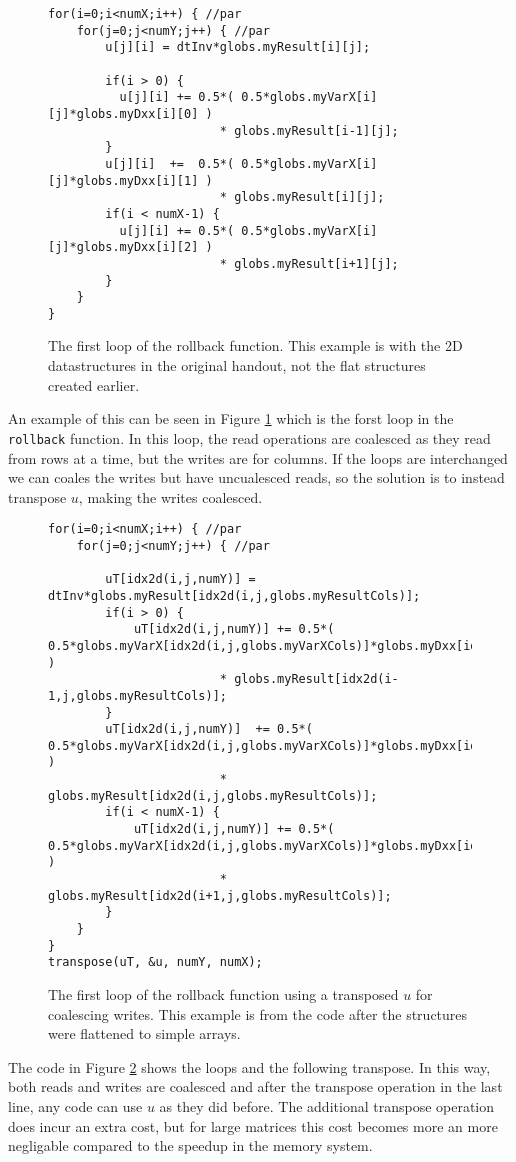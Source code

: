 \begin{figure}[H]
    \begin{lstlisting}
for(i=0;i<numX;i++) { //par
    for(j=0;j<numY;j++) { //par
        u[j][i] = dtInv*globs.myResult[i][j];

        if(i > 0) {
          u[j][i] += 0.5*( 0.5*globs.myVarX[i][j]*globs.myDxx[i][0] )
                        * globs.myResult[i-1][j];
        }
        u[j][i]  +=  0.5*( 0.5*globs.myVarX[i][j]*globs.myDxx[i][1] )
                        * globs.myResult[i][j];
        if(i < numX-1) {
          u[j][i] += 0.5*( 0.5*globs.myVarX[i][j]*globs.myDxx[i][2] )
                        * globs.myResult[i+1][j];
        }
    }
}
    \end{lstlisting}
    \caption{The first loop of the rollback function. This example is with the
    2D datastructures in the original handout, not the flat structures created
    earlier.}
    \label{code:coal1}
\end{figure}

An example of this can be seen in Figure \ref{code:coal1} which is the forst
loop in the \texttt{rollback} function. In this loop, the read operations are
coalesced as they read from rows at a time, but the writes are for columns. If
the loops are interchanged we can coales the writes but have uncualesced reads,
so the solution is to instead transpose $u$, making the writes coalesced.

\begin{figure}[H]
    \begin{lstlisting}
for(i=0;i<numX;i++) { //par
    for(j=0;j<numY;j++) { //par

        uT[idx2d(i,j,numY)] = dtInv*globs.myResult[idx2d(i,j,globs.myResultCols)];
        if(i > 0) {
            uT[idx2d(i,j,numY)] += 0.5*( 0.5*globs.myVarX[idx2d(i,j,globs.myVarXCols)]*globs.myDxx[idx2d(i,0,globs.myDxxCols)] )
                        * globs.myResult[idx2d(i-1,j,globs.myResultCols)];
        }
        uT[idx2d(i,j,numY)]  += 0.5*( 0.5*globs.myVarX[idx2d(i,j,globs.myVarXCols)]*globs.myDxx[idx2d(i,1,globs.myDxxCols)] )
                        * globs.myResult[idx2d(i,j,globs.myResultCols)];
        if(i < numX-1) {
            uT[idx2d(i,j,numY)] += 0.5*( 0.5*globs.myVarX[idx2d(i,j,globs.myVarXCols)]*globs.myDxx[idx2d(i,2,globs.myDxxCols)] )
                        * globs.myResult[idx2d(i+1,j,globs.myResultCols)];
        }
    }
}
transpose(uT, &u, numY, numX);
    \end{lstlisting}
    \caption{The first loop of the rollback function using a transposed $u$ for
    coalescing writes. This example is from the code after the structures were
    flattened to simple arrays.}
    \label{code:coal2}
\end{figure}

The code in Figure \ref{code:coal2} shows the loops and the following transpose.
In this way, both reads and writes are coalesced and after the transpose
operation in the last line, any code can use $u$ as they did before. The
additional transpose operation does incur an extra cost, but for large matrices
this cost becomes more an more negligable compared to the speedup in the memory
system.